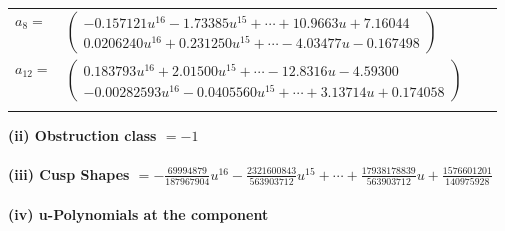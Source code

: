 \documentclass[1p]{elsarticle_modified}
\theoremstyle{definition}
\begin{document}
\begin{tabular}{m{7pt} m{180pt} m{7pt} m{180pt} }
\flushright $a_{8}=$&$\begin{pmatrix}-0.157121 u^{16}-1.73385 u^{15}+\cdots+10.9663 u+7.16044\\0.0206240 u^{16}+0.231250 u^{15}+\cdots-4.03477 u-0.167498\end{pmatrix}$ \\
\flushright $a_{12}=$&$\begin{pmatrix}0.183793 u^{16}+2.01500 u^{15}+\cdots-12.8316 u-4.59300\\-0.00282593 u^{16}-0.0405560 u^{15}+\cdots+3.13714 u+0.174058\end{pmatrix}$\\&\end{tabular}
\flushleft \textbf{(ii) Obstruction class $= -1$}\\~\\
\flushleft \textbf{(iii) Cusp Shapes $= -\frac{69994879}{187967904} u^{16}-\frac{2321600843}{563903712} u^{15}+\cdots+\frac{17938178839}{563903712} u+\frac{1576601201}{140975928}$}\\~\\
\newpage\renewcommand{\arraystretch}{1}
\flushleft \textbf{(iv) u-Polynomials at the component}\newline \\
\end{document}
